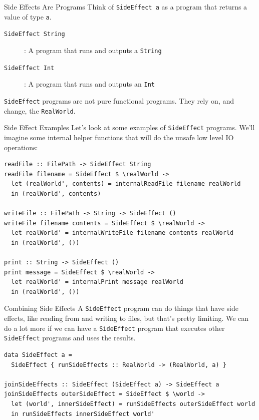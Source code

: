 \documentclass[10pt, presentation, colorlinks]{beamer}
\begin{document}
\begin{frame}[label={sec:org88e87bf},fragile]{Side Effects Are Programs}
 Think of \texttt{SideEffect a} as a \alert{program} that returns a value of type
\texttt{a}.

\bigskip

\begin{description}
\item[{\texttt{SideEffect String}}] : A program that runs and outputs a \texttt{String}
\item[{\texttt{SideEffect Int}}] : A program that runs and outputs an \texttt{Int}
\end{description}

\bigskip

\texttt{SideEffect} programs are not pure functional programs. They rely on, and change, the \texttt{RealWorld}.
\end{frame}

\begin{frame}[label={sec:org101862d},fragile]{Side Effect Examples}
 Let's look at some examples of \texttt{SideEffect} programs. We'll imagine
some internal helper functions that will do the unsafe low level IO
operations:

\begin{verbatim}
readFile :: FilePath -> SideEffect String
readFile filename = SideEffect $ \realWorld ->
  let (realWorld', contents) = internalReadFile filename realWorld
  in (realWorld', contents)

writeFile :: FilePath -> String -> SideEffect ()
writeFile filename contents = SideEffect $ \realWorld ->
  let realWorld' = internalWriteFile filename contents realWorld
  in (realWorld', ())

print :: String -> SideEffect ()
print message = SideEffect $ \realWorld ->
  let realWorld' = internalPrint message realWorld
  in (realWorld', ())
\end{verbatim}
\end{frame}

\begin{frame}[label={sec:org7041fdb},fragile]{Combining Side Effects}
 A \texttt{SideEffect} program can do things that have side effects, like
reading from and writing to files, but that's pretty limiting. We can
do a lot more if we can have a \texttt{SideEffect} program that executes
other \texttt{SideEffect} programs and uses the results.

\begin{verbatim}
data SideEffect a =
  SideEffect { runSideEffects :: RealWorld -> (RealWorld, a) }

joinSideEffects :: SideEffect (SideEffect a) -> SideEffect a
joinSideEffects outerSideEffect = SideEffect $ \world ->
  let (world', innerSideEffect) = runSideEffects outerSideEffect world
  in runSideEffects innerSideEffect world'
\end{verbatim}
\end{frame}
\end{document}
